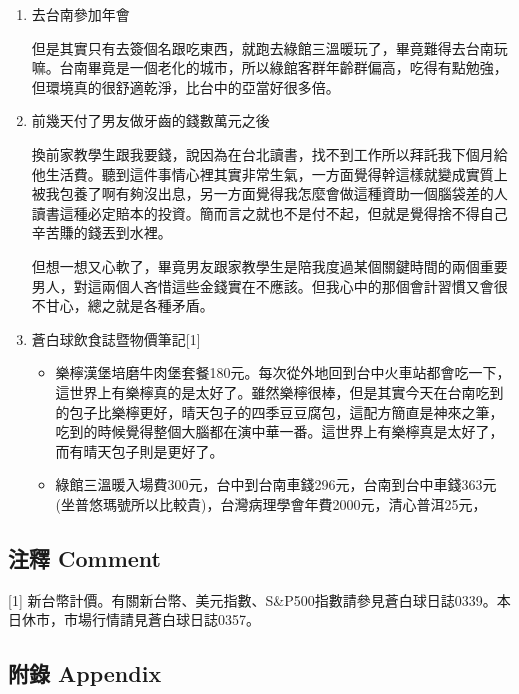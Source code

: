 \documentclass[a5paper, 11pt
]{book}
\providecommand{\tightlist}{%
  \setlength{\itemsep}{0pt}\setlength{\parskip}{0pt}}
\begin{document}
\begin{enumerate}
\def\labelenumi{\arabic{enumi}.}
\item
  去台南參加年會

  但是其實只有去簽個名跟吃東西，就跑去綠館三溫暖玩了，畢竟難得去台南玩嘛。台南畢竟是一個老化的城市，所以綠館客群年齡群偏高，吃得有點勉強，但環境真的很舒適乾淨，比台中的亞當好很多倍。
\item
  前幾天付了男友做牙齒的錢數萬元之後

  換前家教學生跟我要錢，說因為在台北讀書，找不到工作所以拜託我下個月給他生活費。聽到這件事情心裡其實非常生氣，一方面覺得幹這樣就變成實質上被我包養了啊有夠沒出息，另一方面覺得我怎麼會做這種資助一個腦袋差的人讀書這種必定賠本的投資。簡而言之就也不是付不起，但就是覺得捨不得自己辛苦賺的錢丟到水裡。

  但想一想又心軟了，畢竟男友跟家教學生是陪我度過某個關鍵時間的兩個重要男人，對這兩個人吝惜這些金錢實在不應該。但我心中的那個會計習慣又會很不甘心，總之就是各種矛盾。
\item
  蒼白球飲食誌暨物價筆記{[}1{]}

  \begin{itemize}
  \tightlist
  \item
    樂檸漢堡培磨牛肉堡套餐180元。每次從外地回到台中火車站都會吃一下，這世界上有樂檸真的是太好了。雖然樂檸很棒，但是其實今天在台南吃到的包子比樂檸更好，晴天包子的四季豆豆腐包，這配方簡直是神來之筆，吃到的時候覺得整個大腦都在演中華一番。這世界上有樂檸真是太好了，而有晴天包子則是更好了。
  \item
    綠館三溫暖入場費300元，台中到台南車錢296元，台南到台中車錢363元(坐普悠瑪號所以比較貴)，台灣病理學會年費2000元，清心普洱25元，
  \end{itemize}
\end{enumerate}

\hypertarget{ux6ce8ux91cb-comment-19}{%
\subsection{注釋 Comment}\label{ux6ce8ux91cb-comment-19}}

{[}1{]}
新台幣計價。有關新台幣、美元指數、S\&P500指數請參見蒼白球日誌0339。本日休市，市場行情請見蒼白球日誌0357。

\hypertarget{ux9644ux9304-appendix-19}{%
\subsection{附錄 Appendix}\label{ux9644ux9304-appendix-19}}
\end{document}
